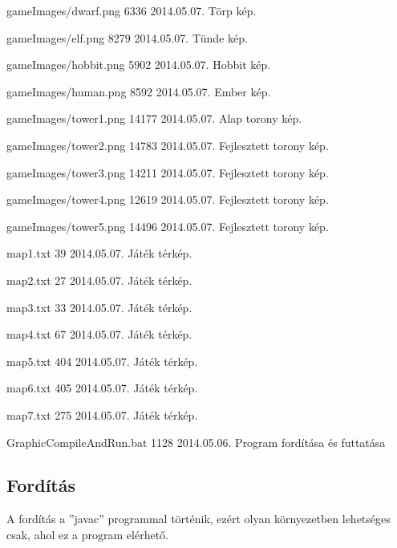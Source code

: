 \begin{fajllista}
\fajl
{gameImages/dwarf.png}
{6336}
{2014.05.07.}
{Törp kép.}

\fajl
{gameImages/elf.png}
{8279}
{2014.05.07.}
{Tünde kép.}

\fajl
{gameImages/hobbit.png}
{5902}
{2014.05.07.}
{Hobbit kép.}

\fajl
{gameImages/human.png}
{8592}
{2014.05.07.}
{Ember kép.}

\fajl
{gameImages/tower1.png}
{14177}
{2014.05.07.}
{Alap torony kép.}

\fajl
{gameImages/tower2.png}
{14783}
{2014.05.07.}
{Fejlesztett torony kép.}

\fajl
{gameImages/tower3.png}
{14211}
{2014.05.07.}
{Fejlesztett torony kép.}

\fajl
{gameImages/tower4.png}
{12619}
{2014.05.07.}
{Fejlesztett torony kép.}

\fajl
{gameImages/tower5.png}
{14496}
{2014.05.07.}
{Fejlesztett torony kép.}

\fajl
{map1.txt}
{39}
{2014.05.07.}
{Játék térkép.}

\fajl
{map2.txt}
{27}
{2014.05.07.}
{Játék térkép.}

\fajl
{map3.txt}
{33}
{2014.05.07.}
{Játék térkép.}

\fajl
{map4.txt}
{67}
{2014.05.07.}
{Játék térkép.}

\fajl
{map5.txt}
{404}
{2014.05.07.}
{Játék térkép.}

\fajl
{map6.txt}
{405}
{2014.05.07.}
{Játék térkép.}

\fajl
{map7.txt}
{275}
{2014.05.07.}
{Játék térkép.}

\fajl
{GraphicCompileAndRun.bat}
{1128}
{2014.05.06.}
{Program fordítása és futtatása}


\end{fajllista}

\lstset{escapeinside=`', xleftmargin=10pt, frame=single, basicstyle=\ttfamily\footnotesize, language=sh}

\subsection{Fordítás}


A fordítás a ''javac'' programmal történik, ezért olyan környezetben lehetséges csak, ahol ez a program elérhető. 

